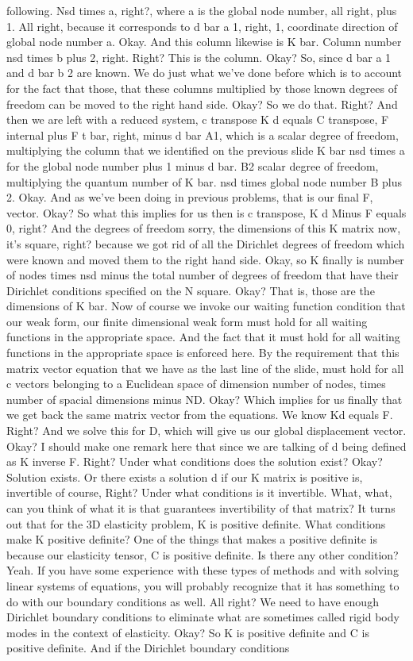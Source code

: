 \documentclass[10pt]{article}
\begin{document}
following. Nsd times a, right?, where a is the global node number, all right, plus 1. All right, because it corresponds to d bar a 1, right, 1, coordinate direction of global node number a. Okay. And this column likewise is K bar. Column number nsd times b plus 2, right. Right? This is the column.  Okay? So, since d bar a 1 and d bar b 2 are known. We do just what we've done before which is to account for the fact that those, that these columns multiplied by those known degrees of freedom can be moved to the right hand side. Okay? So we do that. Right? And then we are left with a reduced system, c transpose K d equals C transpose, F internal plus F t bar, right, minus d bar A1, which is a scalar degree of freedom, multiplying the column that we identified on the previous slide K bar nsd times a for the global node number plus 1 minus d bar. B2 scalar degree of freedom, multiplying the quantum number of K bar. nsd times global node number B plus 2. Okay. And as we've been doing in previous problems, that is our final F, vector. Okay? So what this implies for us then is c transpose, K d Minus F equals 0, right? And the degrees of freedom sorry, the dimensions of this K matrix now, it's square, right? because we got rid of all the Dirichlet degrees of freedom which were known and moved them to the right hand side. Okay, so K finally is number of nodes times nsd minus the total number of degrees of freedom that have their Dirichlet conditions specified on the N square. Okay? That is, those are the dimensions of K bar. Now of course we invoke our waiting function condition that our weak form, our finite dimensional weak form must hold for all waiting functions in the appropriate space. And the fact that it must hold for all waiting functions in the appropriate space is enforced here. By the requirement that this matrix vector equation that we have as the last line of the slide, must hold for all c vectors belonging to a Euclidean space of dimension number of nodes, times number of spacial dimensions minus ND. Okay? Which implies for us finally that we get back the same matrix vector from the equations. We know Kd equals F. Right? And we solve this for D, which will give us our global displacement vector. Okay? I should make one remark here that since we are talking of d being defined as K inverse F. Right? Under what conditions does the solution exist? Okay? Solution exists. Or there exists a solution d if our K matrix is positive is, invertible of course, Right? Under what conditions is it invertible. What, what, can you think of what it is that guarantees invertibility of that matrix? It turns out that for the 3D elasticity problem, K is positive definite. What conditions make K positive definite? One of the things that makes a positive definite is because our elasticity tensor, C is positive definite. Is there any other condition? Yeah. If you have some experience with these types of methods and with solving linear systems of equations, you will probably recognize that it has something to do with our boundary conditions as well. All right? We need to have enough Dirichlet boundary conditions to eliminate what are sometimes called rigid body modes in the context of elasticity. Okay? So K is positive definite and C is positive definite. And if the Dirichlet boundary conditions 
\end{document}
